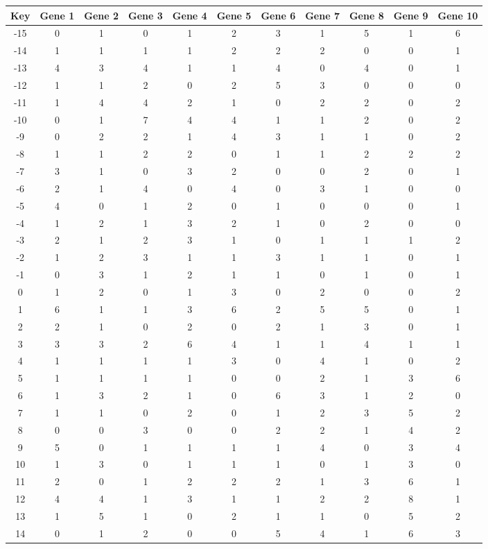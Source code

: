 \begin{tabular}{|c|c|c|c|c|c|c|c|c|c|c|}
\hline
Key & Gene 1 & Gene 2 & Gene 3 & Gene 4 & Gene 5 & Gene 6 & Gene 7 & Gene 8 & Gene 9 & Gene 10 \\
\hline
-15 & 0 & 1 & 0 & 1 & 2 & 3 & 1 & 5 & 1 & 6 \\
-14 & 1 & 1 & 1 & 1 & 2 & 2 & 2 & 0 & 0 & 1 \\
-13 & 4 & 3 & 4 & 1 & 1 & 4 & 0 & 4 & 0 & 1 \\
-12 & 1 & 1 & 2 & 0 & 2 & 5 & 3 & 0 & 0 & 0 \\
-11 & 1 & 4 & 4 & 2 & 1 & 0 & 2 & 2 & 0 & 2 \\
-10 & 0 & 1 & 7 & 4 & 4 & 1 & 1 & 2 & 0 & 2 \\
-9 & 0 & 2 & 2 & 1 & 4 & 3 & 1 & 1 & 0 & 2 \\
-8 & 1 & 1 & 2 & 2 & 0 & 1 & 1 & 2 & 2 & 2 \\
-7 & 3 & 1 & 0 & 3 & 2 & 0 & 0 & 2 & 0 & 1 \\
-6 & 2 & 1 & 4 & 0 & 4 & 0 & 3 & 1 & 0 & 0 \\
-5 & 4 & 0 & 1 & 2 & 0 & 1 & 0 & 0 & 0 & 1 \\
-4 & 1 & 2 & 1 & 3 & 2 & 1 & 0 & 2 & 0 & 0 \\
-3 & 2 & 1 & 2 & 3 & 1 & 0 & 1 & 1 & 1 & 2 \\
-2 & 1 & 2 & 3 & 1 & 1 & 3 & 1 & 1 & 0 & 1 \\
-1 & 0 & 3 & 1 & 2 & 1 & 1 & 0 & 1 & 0 & 1 \\
0 & 1 & 2 & 0 & 1 & 3 & 0 & 2 & 0 & 0 & 2 \\
1 & 6 & 1 & 1 & 3 & 6 & 2 & 5 & 5 & 0 & 1 \\
2 & 2 & 1 & 0 & 2 & 0 & 2 & 1 & 3 & 0 & 1 \\
3 & 3 & 3 & 2 & 6 & 4 & 1 & 1 & 4 & 1 & 1 \\
4 & 1 & 1 & 1 & 1 & 3 & 0 & 4 & 1 & 0 & 2 \\
5 & 1 & 1 & 1 & 1 & 0 & 0 & 2 & 1 & 3 & 6 \\
6 & 1 & 3 & 2 & 1 & 0 & 6 & 3 & 1 & 2 & 0 \\
7 & 1 & 1 & 0 & 2 & 0 & 1 & 2 & 3 & 5 & 2 \\
8 & 0 & 0 & 3 & 0 & 0 & 2 & 2 & 1 & 4 & 2 \\
9 & 5 & 0 & 1 & 1 & 1 & 1 & 4 & 0 & 3 & 4 \\
10 & 1 & 3 & 0 & 1 & 1 & 1 & 0 & 1 & 3 & 0 \\
11 & 2 & 0 & 1 & 2 & 2 & 2 & 1 & 3 & 6 & 1 \\
12 & 4 & 4 & 1 & 3 & 1 & 1 & 2 & 2 & 8 & 1 \\
13 & 1 & 5 & 1 & 0 & 2 & 1 & 1 & 0 & 5 & 2 \\
14 & 0 & 1 & 2 & 0 & 0 & 5 & 4 & 1 & 6 & 3 \\
\hline
\end{tabular}